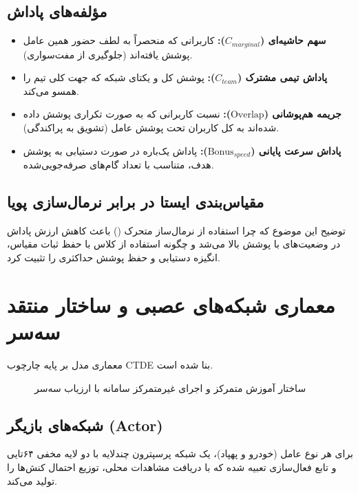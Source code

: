 \documentclass[a4paper,12pt,oneside]{report}
\begin{document}
\subsection{مؤلفه‌های پاداش}
\begin{itemize}
    \item \textbf{سهم حاشیه‌ای ($C_{marginal}$):} کاربرانی که منحصراً به لطف حضور همین عامل پوشش یافته‌اند (جلوگیری از مفت‌سواری).
    \item \textbf{پاداش تیمی مشترک ($C_{team}$):} پوشش کل و یکتای شبکه که جهت کلی تیم را همسو می‌کند.
    \item \textbf{جریمه هم‌پوشانی ($\text{Overlap}$):} نسبت کاربرانی که به صورت تکراری پوشش داده شده‌اند به کل کاربران تحت پوشش عامل (تشویق به پراکندگی).
    \item \textbf{پاداش سرعت پایانی ($\text{Bonus}_{speed}$):} پاداش یک‌باره در صورت دستیابی به پوشش هدف، متناسب با تعداد گام‌های صرفه‌جویی‌شده.
\end{itemize}

\subsection{مقیاس‌بندی ایستا در برابر نرمال‌سازی پویا}
توضیح این موضوع که چرا استفاده از نرمال‌ساز متحرک () باعث کاهش ارزش پاداش در وضعیت‌های با پوشش بالا می‌شد و چگونه استفاده از کلاس  با حفظ ثبات مقیاس، انگیزه دستیابی و حفظ پوشش حداکثری را تثبیت کرد.

\section{معماری شبکه‌های عصبی و ساختار منتقد سه‌سر}
معماری مدل بر پایه چارچوب \gls{CTDE} بنا شده است.

\begin{figure}[H]
    \centering
    \caption{ساختار آموزش متمرکز و اجرای غیرمتمرکز سامانه با ارزیاب سه‌سر}
    \label{fig:ctde_architecture}
\end{figure}

\subsection{شبکه‌های بازیگر (Actor)}
برای هر نوع عامل (خودرو و پهپاد)، یک شبکه پرسپترون چندلایه با دو لایه مخفی ۶۴تایی و تابع فعال‌سازی  تعبیه شده که با دریافت مشاهدات محلی، توزیع احتمال کنش‌ها را تولید می‌کند.
\end{document}
